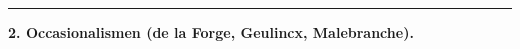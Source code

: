 \documentclass[12pt,a4paper]{book}
\newcommand{\divrule}{\begin{center}\rule{2cm}{0.4pt}\end{center}}
\begin{document}
\divrule

\begin{center}
  \textbf{2. Occasionalismen (de la Forge, Geulincx, Malebranche).}
\end{center}

\end{document}
